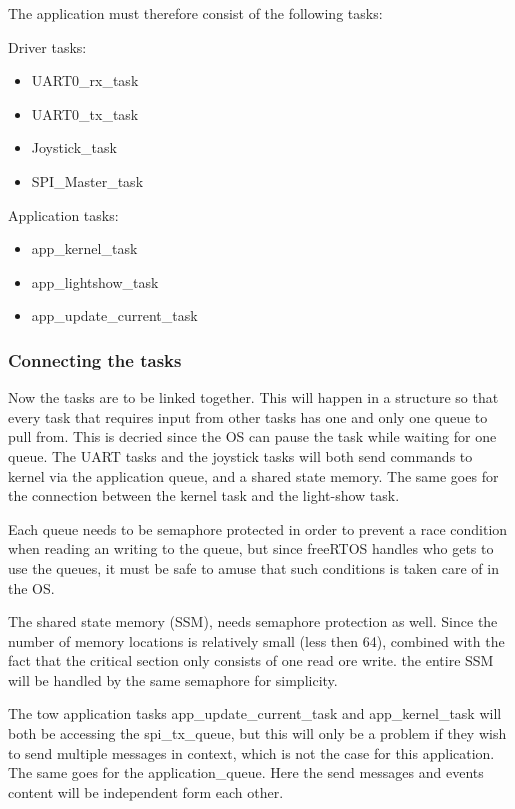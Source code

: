 The application must therefore consist of the following tasks:

Driver tasks:
\begin{itemize}[noitemsep]
	\item UART0\_rx\_task
	\item UART0\_tx\_task
	\item Joystick\_task
	\item SPI\_Master\_task
\end{itemize}

Application tasks:
\begin{itemize}[noitemsep]
	\item app\_kernel\_task
	\item app\_lightshow\_task
	\item app\_update\_current\_task
\end{itemize}	
	
\subsubsection{Connecting the tasks}
Now the tasks are to be linked together. This will happen in a structure so that every task that requires input from other tasks has one and only one queue to pull from. This is decried since the OS can pause the task while waiting for one queue. The UART tasks and the joystick tasks will both send commands to kernel via the application queue, and a shared state memory. The same goes for the connection between the kernel task and the light-show task. 

Each queue needs to be semaphore protected in order to prevent a race condition when reading an writing to the queue, but since freeRTOS handles who gets to use the queues, it must be safe to amuse that such conditions is taken care of in the OS. 

The shared state memory (SSM), needs semaphore protection as well. Since the number of memory locations is relatively small (less then 64), combined with the fact that the critical section only consists of one read ore write. the entire SSM will be handled by the same semaphore for simplicity. 

The tow application tasks app\_update\_current\_task and app\_kernel\_task will both be accessing the spi\_tx\_queue, but this will only be a problem if they wish to send multiple messages in context, which is not the case for this application. The same goes for the application\_queue. Here the send messages and events content will be independent form each other.  

